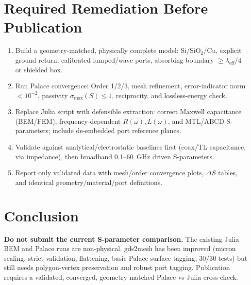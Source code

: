 \documentclass[11pt]{article}
\begin{document}
\section{Required Remediation Before Publication}
\begin{enumerate}
  \item Build a geometry-matched, physically complete model: Si/SiO$_2$/Cu, explicit ground return, calibrated lumped/wave ports, absorbing boundary $\ge \lambda_{\mathrm{eff}}/4$ or shielded box.
  \item Run Palace convergence: Order 1/2/3, mesh refinement, error-indicator norm $<10^{-2}$, passivity $\sigma_{\max}(S)\le 1$, reciprocity, and lossless-energy check.
  \item Replace Julia script with defensible extraction: correct Maxwell capacitance (BEM/FEM), frequency-dependent $R(\omega),L(\omega)$, and MTL/ABCD S-parameters; include de-embedded port reference planes.
  \item Validate against analytical/electrostatic baselines first (coax/TL capacitance, via impedance), then broadband 0.1--60~GHz driven S-parameters.
  \item Report only validated data with mesh/order convergence plots, $\Delta S$ tables, and identical geometry/material/port definitions.
\end{enumerate}

\section{Conclusion}
\textbf{Do not submit the current S-parameter comparison.} The existing Julia BEM and Palace runs are non-physical. gds2mesh has been improved (micron scaling, strict validation, flattening, basic Palace surface tagging; 30/30 tests) but still needs polygon-vertex preservation and robust port tagging. Publication requires a validated, converged, geometry-matched Palace-vs-Julia cross-check.
\end{document}
